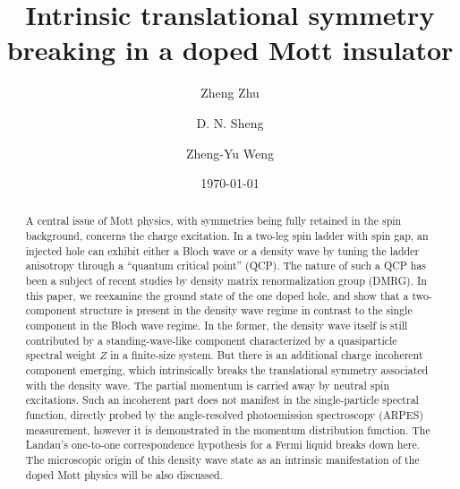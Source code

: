 \documentclass[aps,prb,twocolumn,notitlepage,superscriptaddress,showpacs]{revtex4-1}
\begin{document}
\title{Intrinsic translational symmetry breaking in a doped Mott insulator}
\author{Zheng Zhu}
\author{D. N. Sheng}
\author{Zheng-Yu Weng}

\date{\today}


\begin{abstract}

A central issue of Mott physics, with symmetries being fully retained in the spin background, concerns the charge excitation. In a two-leg spin ladder with spin gap, an injected hole can exhibit either a Bloch wave or a density wave by tuning the ladder anisotropy through a ``quantum critical point'' (QCP). The nature of such a QCP has been a subject of recent studies by density matrix renormalization group (DMRG). In this paper, we reexamine the ground state of the one doped hole, and show that a two-component structure is present in the density wave regime in contrast to the single component in the Bloch wave regime. In the former, the density wave itself is still contributed by a standing-wave-like component characterized by a quasiparticle spectral weight $Z$ in a finite-size system. But there is an additional charge incoherent component emerging, which intrinsically breaks the translational symmetry associated with the density wave. The partial momentum is carried away by neutral spin excitations. Such an incoherent part does not manifest in the single-particle spectral function, directly probed by the angle-resolved photoemission spectroscopy (ARPES) measurement, however it is demonstrated in the momentum distribution function. The Landau's one-to-one correspondence hypothesis for a Fermi liquid breaks down here. The microscopic origin of this density wave state as an intrinsic manifestation of the doped Mott physics will be also discussed.

\end{abstract}



\maketitle
\end{document}
